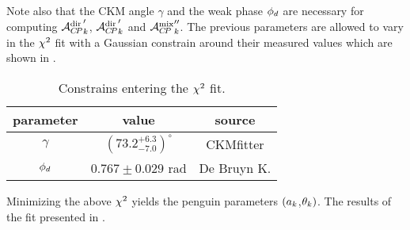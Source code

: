 \noindent Note also that the CKM angle $\gamma$ and the weak phase $\phi_{d}$ are necessary for computing
${\mathcal{A}_{C\!P}^{\rm dir}}'_k$, ${\mathcal{A}_{C\!P}^{\rm dir}}'_k$ and ${\mathcal{A}_{C\!P}^{\rm mix}}''_k$. The previous parameters are allowed to vary in the
$\chi^2$ fit with a Gaussian constrain around their measured values which are shown in .

\begin{table}[!h]
  \center
  \begin{tabular}{c c c}
    \hline
    parameter & value & source \\
    \hline
    $\gamma$      & $\left(73.2_{-7.0}^{+6.3}\right)^{\circ}$ & CKMfitter \cite{Charles:2015gya} \\
    $\phi_{d}$       & $0.767 \pm 0.029$ rad & De Bruyn K.\cite{DeBruyn-thesis} \\
    \hline
  \end{tabular}
  \caption{\small Constrains entering the $\chi^2$ fit.}
  \label{chi2_fit_constrains}
\end{table}

\noindent Minimizing the above $\chi^2$ yields the penguin parameters $(a_k$,$\theta_k)$.
The results of the fit presented in .
